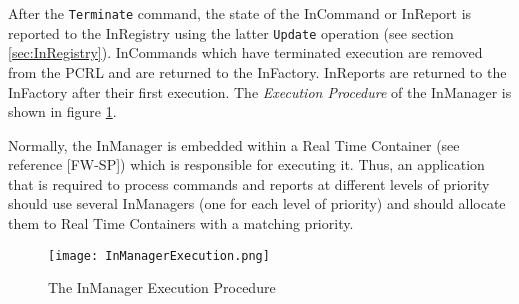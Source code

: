 After the \texttt{Terminate} command, the state of the InCommand or InReport is reported to the InRegistry using the latter \texttt{Update} operation (see section \ref{sec:InRegistry}). InCommands which have terminated execution are removed from the PCRL and are returned to the InFactory. InReports are returned to the InFactory after their first execution. The \textit{Execution Procedure} of the InManager is shown in figure \ref{fig:InManagerExecution}.

Normally, the InManager is embedded within a Real Time Container (see reference [FW-SP]) which is responsible for executing it. Thus, an application that is required to process commands and reports at different levels of priority should use several InManagers (one for each level of priority) and should allocate them to Real Time Containers with a matching priority.

\begin{figure}[H]
 \centering
 \texttt{[image: InManagerExecution.png]}
 \caption{The InManager Execution Procedure}
 \label{fig:InManagerExecution}
\end{figure}

